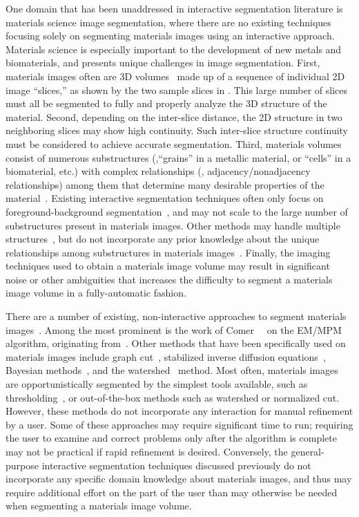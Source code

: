 \documentclass[]{spie}  %
\begin{document}
One domain that has been unaddressed in interactive segmentation
literature is materials science image segmentation, where there are no
existing techniques focusing solely on segmenting materials images
using an interactive approach.  Materials science is especially
important to the development of new metals and biomaterials, and
presents unique challenges in image segmentation.  First, materials
images often are 3D volumes~\cite{ibrahim:91} made up of a sequence of
individual 2D image ``slices,'' as shown by the two sample slices in
.  This large number of slices must all be segmented to
fully and properly analyze the 3D structure of the material.  Second,
depending on the inter-slice distance, the 2D structure in two
neighboring slices may show high continuity.  Such inter-slice
structure continuity must be considered to achieve accurate
segmentation.  Third, materials volumes consist of numerous
substructures (\eg,``grains'' in a metallic material, or ``cells'' in
a biomaterial, etc.) with complex relationships (\eg,
adjacency/nonadjacency relationships) among them that determine many
desirable properties of the material~\cite{swiler:95, rollett:04}.
Existing interactive segmentation techniques often only focus on
foreground-background segmentation~\cite{rother:04, boykov:01b}, and
may not scale to the large number of substructures present in
materials images.  Other methods may handle multiple
structures~\cite{straehle:11, straehle:12}, but do not incorporate any
prior knowledge about the unique relationships among substructures in
materials images~\cite{reed:06, tan:04}.  Finally, the imaging
techniques used to obtain a materials image volume may result in
significant noise or other ambiguities that increases the difficulty
to segment a materials image volume in a fully-automatic fashion.

There are a number of existing, non-interactive approaches to segment
materials images~\cite{chuang:08, simmons:09}.  Among the most
prominent is the work of Comer~\etal~\cite{comer:94, comer:00} on the
EM/MPM algorithm, originating from~\cite{marroquin:87}.  Other methods
that have been specifically used on materials images include graph
cut~\cite{landis:11, waggoner:11}, stabilized inverse diffusion
equations~\cite{huffman:08}, Bayesian methods~\cite{comer:11,
  simmons:08}, and the watershed~\cite{liq:07} method.  Most often,
materials images are opportunistically segmented by the simplest tools
available, such as thresholding~\cite{gonzalez:08,shapiro:01}, or
out-of-the-box methods such as watershed or normalized cut.  However,
these methods do not incorporate any interaction for manual refinement
by a user.  Some of these approaches may require significant time to
run; requiring the user to examine and correct problems only after the
algorithm is complete may not be practical if rapid refinement is
desired.  Conversely, the general-purpose interactive segmentation
techniques discussed previously do not incorporate any specific domain
knowledge about materials images, and thus may require additional
effort on the part of the user than may otherwise be needed when
segmenting a materials image volume.
\end{document}
